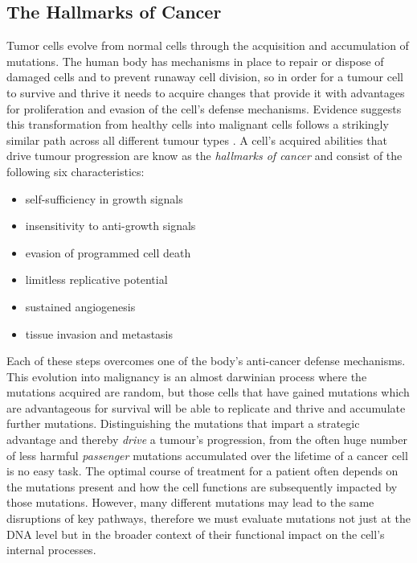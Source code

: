 \subsection{The Hallmarks of Cancer}

Tumor cells evolve from normal cells through the acquisition and accumulation of mutations. The human body has mechanisms in place to repair or dispose of damaged cells and to prevent runaway cell division, so in order for a tumour cell to survive and thrive it needs to acquire changes that provide it with advantages for proliferation and evasion of the cell's defense mechanisms. Evidence suggests this transformation from healthy cells into malignant cells follows a strikingly similar path across all different tumour types \cite{}. A cell's acquired abilities that drive tumour progression are know as the \emph{hallmarks of cancer} and consist of the following six characteristics:

\begin{itemize}
    \itemsep-0.5em
    \item self-sufficiency in growth signals
    \item insensitivity to anti-growth signals
    \item evasion of programmed cell death
    \item limitless replicative potential
    \item sustained angiogenesis
    \item tissue invasion and metastasis
\end{itemize}

Each of these steps overcomes one of the body's anti-cancer defense mechanisms. This evolution into malignancy is an almost darwinian process where the mutations acquired are random, but those cells that have gained mutations which are advantageous for survival will be able to replicate and thrive and accumulate further mutations. Distinguishing the mutations that impart a strategic advantage and thereby \emph{drive} a tumour's progression, from the often huge number of less harmful \emph{passenger} mutations accumulated over the lifetime of a cancer cell is no easy task. The optimal course of treatment for a patient often depends on the mutations present and how the cell functions are subsequently impacted by those mutations. However, many different mutations may lead to the same disruptions of key pathways, therefore we must evaluate mutations not just at the DNA level but in the broader context of their functional impact on the cell's internal processes.



